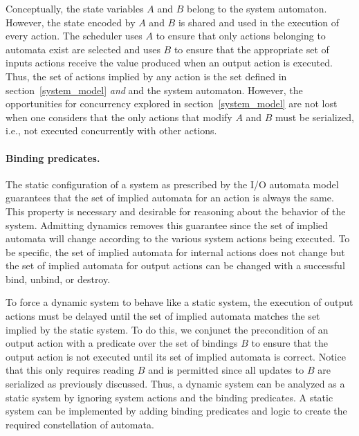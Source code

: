 Conceptually, the state variables $A$ and $B$ belong to the system automaton.
However, the state encoded by $A$ and $B$ is shared and used in the execution of every action.
The scheduler uses $A$ to ensure that only actions belonging to automata exist are selected and uses $B$ to ensure that the appropriate set of inputs actions receive the value produced when an output action is executed.
Thus, the set of actions implied by any action is the set defined in section~\ref{system_model} \emph{and} and the system automaton.
However, the opportunities for concurrency explored in section~\ref{system_model} are not lost when one considers that the only actions that modify $A$ and $B$ must be serialized, i.e., not executed concurrently with other actions.

\paragraph{Binding predicates.}
The static configuration of a system as prescribed by the I/O automata model guarantees that the set of implied automata for an action is always the same.
This property is necessary and desirable for reasoning about the behavior of the system.
Admitting dynamics removes this guarantee since the set of implied automata will change according to the various system actions being executed.
To be specific, the set of implied automata for internal actions does not change but the set of implied automata for output actions can be changed with a successful bind, unbind, or destroy.

To force a dynamic system to behave like a static system, the execution of output actions must be delayed until the set of implied automata matches the set implied by the static system.
To do this, we conjunct the precondition of an output action with a predicate over the set of bindings $B$ to ensure that the output action is not executed until its set of implied automata is correct.
Notice that this only requires reading $B$ and is permitted since all updates to $B$ are serialized as previously discussed.
Thus, a dynamic system can be analyzed as a static system by ignoring system actions and the binding predicates.
A static system can be implemented by adding binding predicates and logic to create the required constellation of automata.
